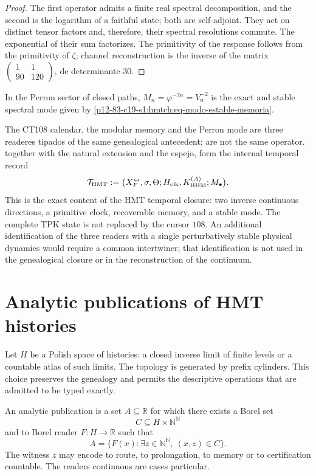 \begin{proof}
The first operator admits a finite real spectral decomposition, and the
second is the logarithm of a faithful state; both are self-adjoint. They act on
distinct tensor factors and, therefore, their spectral resolutions
commute. The exponential of their sum factorizes. The primitivity of the response
follows from the primitivity of \(\zeta\); channel reconstruction is the
inverse of the matrix
\(\left(\begin{smallmatrix}1&1\\90&120\end{smallmatrix}\right)\), de
determinante \(30\).
\end{proof}

\begin{corollary}
\label{p12-83-c19-s1:hmtch:cor-modo-estable-memoria}
In the Perron sector of closed paths,
\(M_n=\varphi^{-2n}=V_n^{-2}\) is the exact and stable spectral mode given
by \eqref{p12-83-c19-s1:hmtch:eq-modo-estable-memoria}.
\end{corollary}

The CT108 calendar, the modular memory and the Perron mode are three readeres
tipados of the same genealogical antecedent; are not the same operator. together with
the natural extension and the espejo, form the internal temporal record
\[
 \mathcal T_{\rm HMT}
 :=\bigl(X_F^{\leftrightarrow},\sigma,\Theta;
 H_{\rm clk},K_{\rm HHM}^{(A)};M_\bullet\bigr).
\]
This is the exact content of the HMT temporal closure: two inverse
continuous directions, a primitive clock, recoverable memory, and a stable mode. The
complete TPK state is not replaced by the cursor \(108\). An additional
identification of the three readers with a single perturbatively stable physical
dynamics would require a common intertwiner; that identification is not used in
the genealogical closure or in the reconstruction of the continuum.

\section{Analytic publications of HMT histories}

Let \(H\) be a Polish space of histories: a closed inverse limit of
finite levels or a countable atlas of such limits. The topology is
generated by prefix cylinders. This choice preserves the genealogy and
permits the descriptive operations that are admitted to be typed exactly.

\begin{definition}
\label{p12-83-c19-s1:hmtch:def-publicacion-analitica}
An analytic publication is a set \(A\subseteq\mathbb R\) for which
there exists a Borel set
\[
 C\subseteq H\times\mathbb N^{\mathbb N}
\]
and to Borel reader \(F:H\to\mathbb R\) such that
\[
 A=\{F(x):\exists z\in\mathbb N^{\mathbb N},\ (x,z)\in C\}.
\]
The witness \(z\) may encode to route, to prolongation, to memory or
to certification countable. The readers continuous are cases particular.
\end{definition}

